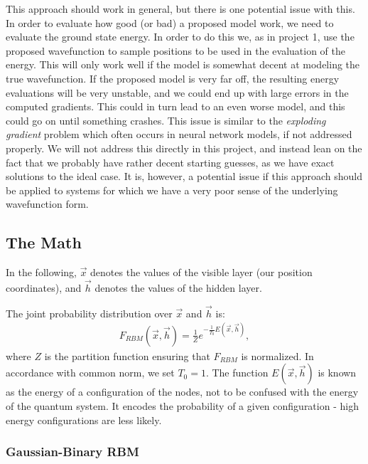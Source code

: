 \documentclass[a4paper, 11pt]{article}
\begin{document}
\begin{multicols}{2}
    This approach should work in general, but there is one potential issue with
    this. In order to evaluate how good (or bad) a proposed model work, we need
    to evaluate the ground state energy. In order to do this we, as in project
    1, use the proposed wavefunction to sample positions to be used in the
    evaluation of the energy. This will only work well if the model is somewhat
    decent at modeling the true wavefunction. If the proposed model is very far
    off, the resulting energy evaluations will be very unstable, and we could
    end up with large errors in the computed gradients. This could in turn lead
    to an even worse model, and this could go on until something crashes. This
    issue is similar to the \emph{exploding gradient} problem which often occurs
    in neural network models, if not addressed properly. We will not address
    this directly in this project, and instead lean on the fact that we probably
    have rather decent starting guesses, as we have exact solutions to the ideal
    case. It is, however, a potential issue if this approach should be applied
    to systems for which we have a very poor sense of the underlying
    wavefunction form.

    \subsection{The Math}

    In the following, $\vec x$ denotes the values of the visible layer (our
    position coordinates), and $\vec h$ denotes the values of the hidden layer.

    The joint probability distribution over $\vec x$ and $\vec h$ is:
    \begin{align}
        F_{RBM}(\vec x, \vec h) = \frac{1}{Z} e^{-\frac{1}{T_0}E(\vec x, \vec
        h)}\label{eq:F-RBM-def},
    \end{align}
    where $Z$ is the partition function ensuring that $F_{RBM}$ is normalized.
    In accordance with common norm, we set $T_0=1$. The function $E(\vec x, \vec
    h)$ is known as the energy of a configuration of the nodes, not to be
    confused with the energy of the quantum system. It encodes the probability
    of a given configuration - high energy configurations are less likely.

    \subsubsection{Gaussian-Binary RBM}


\end{multicols}
\end{document}
